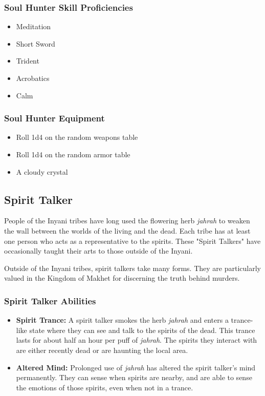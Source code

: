 \begin{multicols}{2}
\subsubsection{Soul Hunter Skill Proficiencies}

\begin{itemize}
  \item Meditation
  \item Short Sword
  \item Trident
  \item Acrobatics
  \item Calm
\end{itemize}

\subsubsection{Soul Hunter Equipment}

\begin{itemize}
  \item Roll 1d4 on the random weapons table
  \item Roll 1d4 on the random armor table
  \item A cloudy crystal
\end{itemize}

\subsection{Spirit Talker}

People of the Inyani tribes have long used the flowering herb \textit{jahrah} 
to weaken the wall between the worlds of the living and the dead. Each tribe
has at least one person who acts as a representative to the spirits. These
"Spirit Talkers" have occasionally taught their arts to those outside of the
Inyani.

Outside of the Inyani tribes, spirit talkers take many forms. They are
particularly valued in the Kingdom of Makhet for discerning the truth
behind murders.

\subsubsection{Spirit Talker Abilities}

\begin{itemize}
  \item \textbf{Spirit Trance:} A spirit talker smokes the herb \textit{jahrah} and
    enters a trance-like state where they can see and talk to the spirits of
    the dead. This trance lasts for about half an hour per puff of \textit{jahrah}. The
    spirits they interact with are either recently dead or are haunting the
    local area.
  \item \textbf{Altered Mind:} Prolonged use of \textit{jahrah} has altered the spirit
    talker's mind permanently. They can sense when spirits are nearby, and are
    able to sense the emotions of those spirits, even when not in a trance.
\end{itemize}


\end{multicols}
